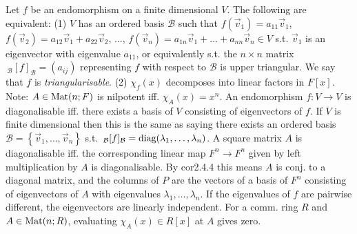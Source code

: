 Let $f$ be an endomorphism on a finite dimensional $V$. The following are equivalent:
(1) $V$ has an ordered basis $\mathcal{B}$ such that $f(\vec{v}_1) = a_{11}\vec{v}_1$, $f(\vec{v}_2) = a_{12}\vec{v}_1 + a_{22}\vec{v}_2$, ..., $f(\vec{v}_n) = a_{1n}\vec{v}_1 + \dots + a_{nn}\vec{v}_n \in V$ s.t. $\vec{v}_1$ is an eigenvector with eigenvalue $a_{11}$, or equivalently s.t. the $n \times n$ matrix $\,_{\mathcal{B}}[f]_{\mathcal{B}} = (a_{ij})$ representing $f$ with respect to $\mathcal{B}$ is upper triangular. We say that $f$ is \emph{triangularisable}.
(2) $\chi_f(x)$ decomposes into linear factors in $F[x]$.
Note: $A \in \text{Mat}(n; F)$  is nilpotent iff. $\chi_A(x) = x^n$.
 An endomorphism $f : V \to V$ is diagonalisable iff. there exists a basis of $V$ consisting of eigenvectors of $f$. If $V$ is finite dimensional then this is the same as saying there exists an ordered basis $\mathcal{B} = \left\{ \vec{v}_1, \dots, \vec{v}_n \right\}$ s.t. $\,_{\mathcal{B}}[f]_{\mathcal{B}} = \text{diag}(\lambda_1, \dots, \lambda_n)$.
A square matrix $A$ is diagonalisable iff. the corresponding linear map $F^n \rightarrow F^n$ given by left multiplication by $A$ is diagonalisable. By cor2.4.4 this means $A$ is conj. to a diagonal matrix, and the columns of $P$ are the vectors of a basis of $F^n$ consisting of eigenvectors of $A$ with eigenvalues $\lambda_1, \dots, \lambda_n$.
 If the eigenvalues of $f$ are pairwise different, the eigenvectors are linearly independent.
 For a comm. ring $R$ and $A \in \text{Mat}(n; R)$, evaluating $\chi_A(x) \in R[x]$ at $A$ gives zero.
